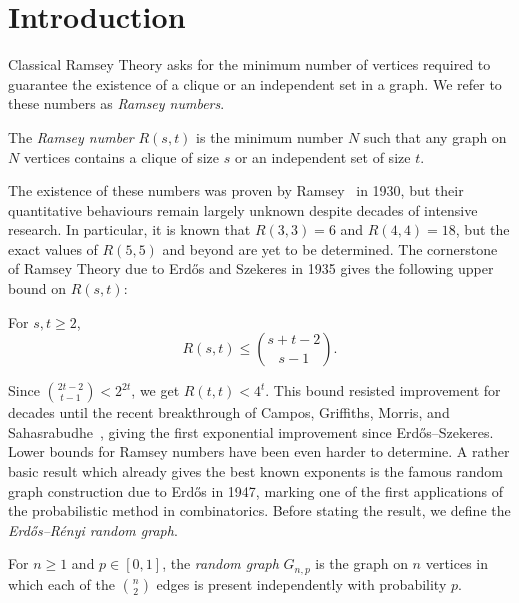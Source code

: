 \section{Introduction}
\label{sec:ch1}

Classical Ramsey Theory asks for the minimum number of vertices required to guarantee the existence of a clique or an independent set in a graph. We refer to these numbers as \textit{Ramsey numbers}.

\begin{definition}
  \label{def:ramsey-number}
  The \textit{Ramsey number} $R(s, t)$ is the minimum number $N$ such that any graph on $N$ vertices contains a clique of size $s$ or an independent set of size $t$.
\end{definition}

The existence of these numbers was proven by Ramsey~\cite{ramsey1930} in 1930, but their quantitative behaviours remain largely unknown despite decades of intensive research. In particular, it is known that $R(3, 3) = 6$ and $R(4, 4) = 18$, but the exact values of $R(5, 5)$ and beyond are yet to be determined. The cornerstone of Ramsey Theory due to Erd\H{o}s and Szekeres in 1935 gives the following upper bound on $R(s, t)$:
\begin{theorem}
  \label{thm:erdos-szekeres}
  For $s, t \geq 2$,
  \[
    R(s, t) \leq \binom{s + t - 2}{s - 1}.
  \]
\end{theorem}
Since $\binom{2t-2}{t-1} < 2^{2t}$, we get $R(t,t) < 4^t$. This bound resisted improvement for decades until the recent breakthrough of Campos, Griffiths, Morris, and Sahasrabudhe~\cite{campos2025exponentialimprovementdiagonalramsey}, giving the first exponential improvement since Erd\H{o}s--Szekeres. Lower bounds for Ramsey numbers have been even harder to determine. A rather basic result which already gives the best known exponents is the famous random graph construction due to Erd\H{o}s in 1947, marking one of the first applications of the probabilistic method in combinatorics. Before stating the result, we define the \textit{Erd\H{o}s--R\'{e}nyi random graph}.

\begin{definition}
  \label{def:random-graph}

  For $n \geq 1$ and $p \in [0, 1]$, the \textit{random graph} $G_{n, p}$ is the graph on $n$ vertices in which each of the $\binom{n}{2}$ edges is present independently with probability $p$.
\end{definition}

